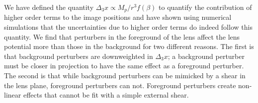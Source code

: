 We have defined the quantity $\Delta_3 x  \propto M_p /r^3 f(\beta)$ to quantify the contribution of higher order terms to the image positions and have shown using numerical simulations that the uncertainties due to higher order terms do indeed follow this quantity. We find that perturbers in the foreground of the lens affect the lens potential more than those in the background for two different reasons. The first is that background perturbers are downweighted in $\Delta_3 x$; a background perturber must be closer in projection to have the same effect as a foreground perturber. The second is that while background perturbers can be mimicked by a shear in the lens plane, foreground perturbers can not. Foreground perturbers create non-linear effects that cannot be fit with a simple external shear.